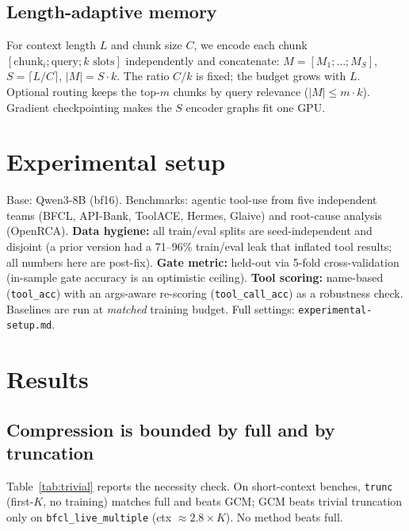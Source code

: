\documentclass[11pt]{article}
\begin{document}
\subsection{Length-adaptive memory}\label{sec:lam}
For context length $L$ and chunk size $C$, we encode each chunk $[\text{chunk}_i;\text{query};k\text{ slots}]$
independently and concatenate: $M=[M_1;\dots;M_S]$, $S=\lceil L/C\rceil$, $|M|=S\cdot k$. The ratio $C/k$ is
fixed; the budget grows with $L$. Optional routing keeps the top-$m$ chunks by query relevance
($|M|\le m\cdot k$). Gradient checkpointing makes the $S$ encoder graphs fit one GPU.

\section{Experimental setup}\label{sec:setup}
Base: Qwen3-8B (bf16). Benchmarks: agentic tool-use from five independent teams (BFCL, API-Bank, ToolACE,
Hermes, Glaive) and root-cause analysis (OpenRCA). \textbf{Data hygiene:} all train/eval splits are
seed-independent and disjoint (a prior version had a 71--96\% train/eval leak that inflated tool results; all
numbers here are post-fix). \textbf{Gate metric:} held-out via 5-fold cross-validation (in-sample gate accuracy
is an optimistic ceiling). \textbf{Tool scoring:} name-based (\texttt{tool\_acc}) with an args-aware
re-scoring (\texttt{tool\_call\_acc}) as a robustness check. Baselines are run at \emph{matched} training
budget. Full settings: \texttt{experimental-setup.md}.

\section{Results}
\subsection{Compression is bounded by full and by truncation}
Table~\ref{tab:trivial} reports the necessity check. On short-context benches, \texttt{trunc} (first-$K$, no
training) matches full and beats GCM; GCM beats trivial truncation only on \texttt{bfcl\_live\_multiple}
(ctx $\approx 2.8\times K$). No method beats full.
\end{document}
